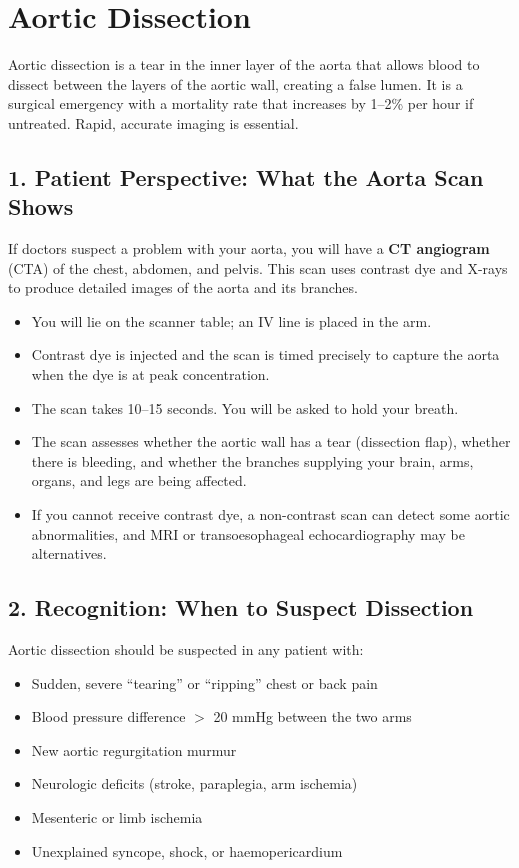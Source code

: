 \chapter{Aortic Dissection}

\label{ch:ch74_aortic_dissection}

Aortic dissection is a tear in the inner layer of the aorta that allows blood to dissect between the layers of the aortic wall, creating a false lumen. It is a surgical emergency with a mortality rate that increases by 1--2\% per hour if untreated. Rapid, accurate imaging is essential.


\section{1. Patient Perspective: What the Aorta Scan Shows}

If doctors suspect a problem with your aorta, you will have a \textbf{CT angiogram} (CTA) of the chest, abdomen, and pelvis. This scan uses contrast dye and X-rays to produce detailed images of the aorta and its branches.

\begin{itemize}
  \item You will lie on the scanner table; an IV line is placed in the arm.
  \item Contrast dye is injected and the scan is timed precisely to capture the aorta when the dye is at peak concentration.
  \item The scan takes 10--15 seconds. You will be asked to hold your breath.
  \item The scan assesses whether the aortic wall has a tear (dissection flap), whether there is bleeding, and whether the branches supplying your brain, arms, organs, and legs are being affected.
  \item If you cannot receive contrast dye, a non-contrast scan can detect some aortic abnormalities, and MRI or transoesophageal echocardiography may be alternatives.
\end{itemize}


\section{2. Recognition: When to Suspect Dissection}

Aortic dissection should be suspected in any patient with:
\begin{itemize}
  \item Sudden, severe ``tearing'' or ``ripping'' chest or back pain
  \item Blood pressure difference $>$ 20 mmHg between the two arms
  \item New aortic regurgitation murmur
  \item Neurologic deficits (stroke, paraplegia, arm ischemia)
  \item Mesenteric or limb ischemia
  \item Unexplained syncope, shock, or haemopericardium
\end{itemize}

